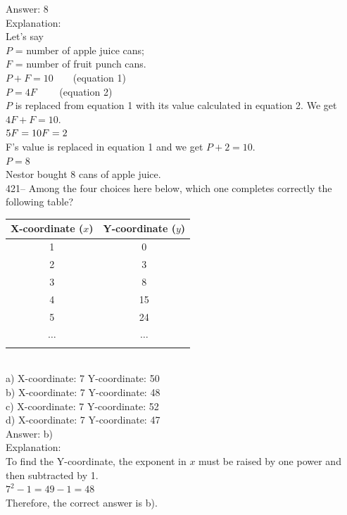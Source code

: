 \documentclass[letterpaper, 12pt]{article}
\begin{document}
Answer:  8\\

Explanation: \\
Let's say\\
$P$ = number of apple juice cans;\\
$F$ = number of fruit punch cans.\\
$P+F=10 \qquad $(equation 1)\\
$P=4F \qquad$ (equation 2)\\
$P$ is replaced from equation 1 with its value calculated in equation 2.
We get $4F+F=10$.\\
$5F=10\\
F=2$\\
F's value is replaced in equation 1 and we get $P+2=10$.\\
$P=8$\\
Nestor bought 8 cans of apple juice.\\



421-- Among the four choices here below, which one completes correctly the following table?\\
\begin{tabular}{|c|c|} \hline

{\bf X-coordinate ($x$)} & {\bf Y-coordinate ($y$)}  \\ \hline \hline
1 & 0 \\ \hline
2 & 3 \\ \hline
3 & 8 \\ \hline
4 & 15 \\ \hline
5 & 24 \\ \hline
$\ldots$ & $\ldots$ \\ \hline
\multicolumn{2}{c}{}\\
\end{tabular}\\
a) X-coordinate: 7 \qquad Y-coordinate: 50\\
b) X-coordinate: 7 \qquad Y-coordinate: 48\\
c) X-coordinate: 7 \qquad Y-coordinate: 52\\
d) X-coordinate: 7 \qquad Y-coordinate: 47\\

Answer:  b)\\

Explanation: \\
To find the Y-coordinate, the exponent in $x$ must be raised by one power and then subtracted by 1.\\
$7^{2}-1=49-1=48$\\
Therefore, the correct answer is b).\\
\end{document}
